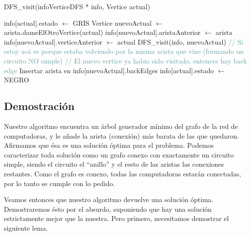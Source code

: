 \begin{algorithm}[H]
\begin{algorithmic}[1]
\caption{DFS\_visit(infoVerticeDFS * info, Vertice actual)}
\STATE info[actual].estado $\leftarrow$ GRIS
    \STATE Vertice nuevoActual $\leftarrow$ arista.dameElOtroVertice(actual)
        \STATE info[nuevoActual].aristaAnterior $\leftarrow$ arista
        \STATE info[nuevoActual].verticeAnterior $\leftarrow$ actual
        \STATE DFS\_visit(info, nuevoActual)
            \STATE \textcolor{CadetBlue}{// Si estoy acá es porque estaba volviendo por la misma arista que vine (formando un circuito NO simple)}
        \ELSE
            \STATE \textcolor{CadetBlue}{// El nuevo vertice ya habia sido visitado, entonces hay back edge}
            \STATE Insertar arista en info[nuevoActual].backEdges
        \ENDIF
    \ENDIF
\ENDFOR
\STATE info[actual].estado $\leftarrow$ NEGRO
\end{algorithmic}
\end{algorithm}

\subsection{Demostración}

Nuestro algoritmo encuentra un árbol generador mínimo del grafo de la red de computadoras, y le añade la arista (conexión) más barata de las que quedaron. Afirmamos que ésa es una solución óptima para el problema. Podemos caracterizar toda solución como un grafo conexo con exactamente un circuito simple, siendo el circuito el ``anillo'' y el resto de las aristas las conexiones restantes. Como el grafo es conexo, todas las computadoras estarán conectadas, por lo tanto se cumple con lo pedido.

Veamos entonces que nuestro algoritmo devuelve una solución óptima. Demostraremos ésto por el absurdo, suponiendo que hay una solución estrictamente mejor que la nuestra. Pero primero, necesitamos demostrar el siguiente lema.

